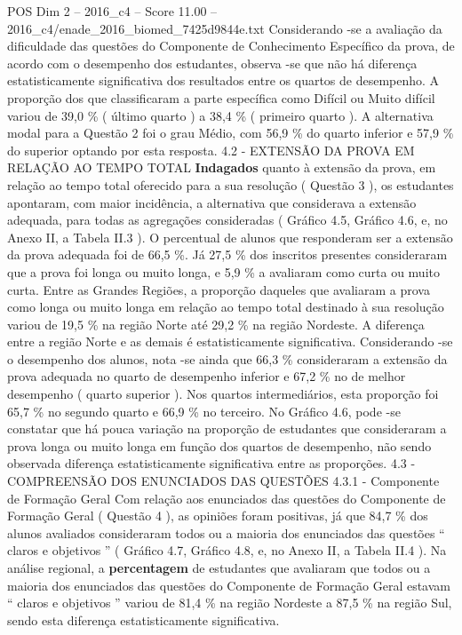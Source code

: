 \begin{textsample}{POS Dim 2 – 2016\_c4 – Score 11.00 – 2016\_c4/enade\_2016\_biomed\_7425d9844e.txt}
Considerando -se a avaliação da dificuldade das questões do Componente de Conhecimento Específico da prova, de acordo com o desempenho dos estudantes, observa -se que não há diferença estatisticamente significativa dos resultados entre os quartos de desempenho.
A proporção dos que classificaram a parte específica como Difícil ou Muito difícil variou de 39,0 \% ( último quarto ) a 38,4 \% ( primeiro quarto ).
A alternativa modal para a Questão 2 foi o grau Médio, com 56,9 \% do quarto inferior e 57,9 \% do superior optando por esta resposta. 4.2 - EXTENSÃO DA PROVA EM RELAÇÃO AO TEMPO TOTAL \textbf{Indagados} quanto à extensão da prova, em relação ao tempo total oferecido para a sua resolução ( Questão 3 ), os estudantes apontaram, com maior incidência, a alternativa que considerava a extensão adequada, para todas as agregações consideradas ( Gráfico 4.5, Gráfico 4.6, e, no Anexo II, a Tabela II.3 ).
O percentual de alunos que responderam ser a extensão da prova adequada foi de 66,5 \%.
Já 27,5 \% dos inscritos presentes consideraram que a prova foi longa ou muito longa, e 5,9 \% a avaliaram como curta ou muito curta.
Entre as Grandes Regiões, a proporção daqueles que avaliaram a prova como longa ou muito longa em relação ao tempo total destinado à sua resolução variou de 19,5 \% na região Norte até 29,2 \% na região Nordeste.
A diferença entre a região Norte e as demais é estatisticamente significativa.
Considerando -se o desempenho dos alunos, nota -se ainda que 66,3 \% consideraram a extensão da prova adequada no quarto de desempenho inferior e 67,2 \% no de melhor desempenho ( quarto superior ).
Nos quartos intermediários, esta proporção foi 65,7 \% no segundo quarto e 66,9 \% no terceiro.
No Gráfico 4.6, pode -se constatar que há pouca variação na proporção de estudantes que consideraram a prova longa ou muito longa em função dos quartos de desempenho, não sendo observada diferença estatisticamente significativa entre as proporções. 4.3 - COMPREENSÃO DOS ENUNCIADOS DAS QUESTÕES 4.3.1 - Componente de Formação Geral Com relação aos enunciados das questões do Componente de Formação Geral ( Questão 4 ), as opiniões foram positivas, já que 84,7 \% dos alunos avaliados consideraram todos ou a maioria dos enunciados das questões “ claros e objetivos ” ( Gráfico 4.7, Gráfico 4.8, e, no Anexo II, a Tabela II.4 ).
Na análise regional, a \textbf{percentagem} de estudantes que avaliaram que todos ou a maioria dos enunciados das questões do Componente de Formação Geral estavam “ claros e objetivos ” variou de 81,4 \% na região Nordeste a 87,5 \% na região Sul, sendo esta diferença estatisticamente significativa.

\end{textsample}
